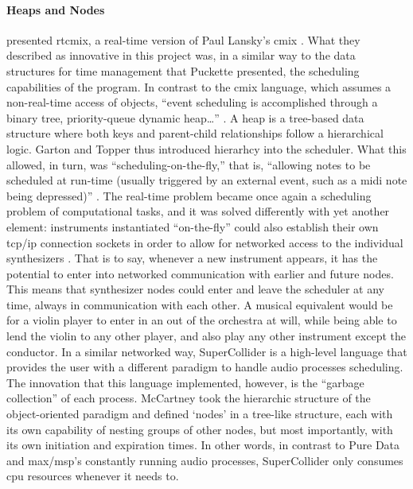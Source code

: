 	\paragraph{Heaps and Nodes}
	\textcite{DBLP:conf/icmc/GartonT97} presented \gls{rtcmix}, a real-time version of Paul Lansky's \gls{cmix} \parencite{DBLP:conf/icmc/Lansky90}. What they described as innovative in this project was, in a similar way to the data structures for time management that Puckette presented, the scheduling capabilities of the program. In contrast to the \gls{cmix} language, which assumes a non-real-time access of objects, ``event scheduling is accomplished through a binary tree, priority-queue dynamic heap\dots '' \parencite{DBLP:conf/icmc/GartonT97}. A heap is a tree-based data structure where both keys and parent-child relationships follow a hierarchical logic. Garton and Topper thus introduced hierarhcy into the scheduler. What this allowed, in turn, was ``scheduling-on-the-fly,'' that is, ``allowing notes to be scheduled at run-time (usually triggered by an external event, such as a \gls{midi} note being depressed)'' \parencite{DBLP:conf/icmc/GartonT97}. The real-time problem became once again a scheduling problem of computational tasks, and it was solved differently with yet another element: instruments instantiated ``on-the-fly'' could also establish their own \gls{tcp/ip} connection sockets in order to allow for networked access to the individual synthesizers \parencite{DBLP:conf/icmc/GartonT97}. That is to say, whenever a new instrument appears, it has the potential to enter into networked communication with earlier and future nodes. This means that synthesizer nodes could enter and leave the scheduler at any time, always in communication with each other. A musical equivalent would be for a violin player to enter in an out of the orchestra at will, while being able to lend the violin to any other player, and also play any other instrument except the conductor. In a similar networked way, SuperCollider \parencites{DBLP:conf/icmc/McCartney96}{DBLP:conf/icmc/McCartney98} is a high-level language that provides the user with a different paradigm to handle audio processes scheduling. The innovation that this language implemented, however, is the ``garbage collection'' of each process. McCartney took the hierarchic structure of the object-oriented paradigm and defined `nodes' in a tree-like structure, each with its own capability of nesting groups of other nodes, but most importantly, with its own initiation and expiration times. In other words, in contrast to Pure Data and \gls{max/msp}'s constantly running audio processes, SuperCollider only consumes \gls{cpu} resources whenever it needs to.

